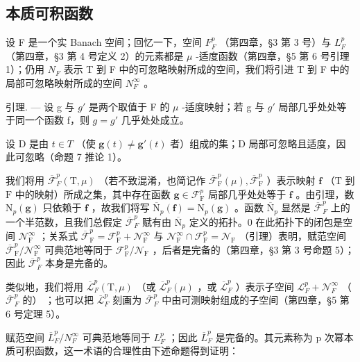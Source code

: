 \subsection{本质可积函数}

设 F 是一个实 Banach 空间；回忆一下，空间 \(F_{F}^{p}\) （第四章，§3 第 3 号）与 \(L_{F}^{p}\) （第四章，§3 第 4 号定义 2）的元素都是 \(\mu\) -适度函数（第四章，§5 第 6 号引理 1）；仍用 \(N_{F}\) 表示 T 到 F 中的可忽略映射所成的空间，我们将引进 T 到 F 中的局部可忽略映射所成的空间 \(N_{F}^{\infty}\) 。

引理. --- 设 g 与 \(g'\) 是两个取值于 F 的 \(\mu\) -适度映射；若 g 与 \(g'\) 局部几乎处处等于同一个函数 f，则 \(g = g'\) 几乎处处成立。

设 D 是由 \(t \in T\) （使 \(\mathbf{g}(t) \neq \mathbf{g}'(t)\) 者）组成的集；D 局部可忽略且适度，因此可忽略（命题 7 推论 1）。

我们将用 \(\overline{\mathcal{F}}_F^p (\mathrm{T},\mu)\) （若不致混淆，也简记作 \(\overline{\mathcal{F}}_{\mathrm{F}}^{p}(\mu),\overline{\mathcal{F}}_{\mathrm{F}}^{p}\) ）表示映射 \(\mathbf{f}\) （\(\mathrm{T}\) 到 \(\mathrm{F}\) 中的映射）所成之集，其中存在函数 \(\mathbf{g}\in \mathcal{F}_{\mathrm{F}}^{p}\) 局部几乎处处等于 \(\mathbf{f}\) 。由引理，数 \(\mathrm{N}_p(\mathbf{g})\) 只依赖于 \(\mathbf{f}\) ，故我们将写 \(\overline{\mathrm{N}}_p(\mathbf{f}) = \mathrm{N}_p(\mathbf{g})\) 。函数 \(\overline{\mathrm{N}}_p\) 显然是 \(\overline{\mathcal{F}}_F^p\) 上的一个半范数，且我们总假定 \(\overline{\mathcal{F}}_F^p\) 赋有由 \(\overline{\mathrm{N}}_p\) 定义的拓扑。0 在此拓扑下的闭包是空间 \(\mathcal{N}_{\mathrm{F}}^{\infty}\) ；关系式 \(\overline{\mathcal{F}}_{\mathrm{F}}^{p} = \mathcal{F}_{\mathrm{F}}^{p} + \mathcal{N}_{\mathrm{F}}^{\infty}\) 与 \(\mathcal{N}_{\mathrm{F}}^{\infty}\cap \mathcal{F}_{\mathrm{F}}^{p} = \mathcal{N}_{\mathrm{F}}\) （引理）表明，赋范空间 \(\overline{\mathcal{F}}_{\mathrm{F}}^{p} / \mathcal{N}_{\mathrm{F}}^{\infty}\) 可典范地等同于 \(\mathcal{F}_{\mathrm{F}}^{p} / \mathcal{N}_{\mathrm{F}}\) ，后者是完备的（第四章，§3 第 3 号命题 5）；因此 \(\overline{\mathcal{F}}_F^p\) 本身是完备的。

类似地，我们将用 \(\overline{\mathcal{L}}_F^p (\mathrm{T},\mu)\) （或 \(\overline{\mathcal{L}}_F^p (\mu)\) ，或 \(\overline{\mathcal{L}}_F^p\) ）表示子空间 \(\mathcal{L}_F^p +\mathcal{N}_F^\infty\) （\(\overline{\mathcal{F}}_F^p\) 的） ；也可以把 \(\overline{\mathcal{L}}_F^p\) 刻画为 \(\overline{\mathcal{F}}_F^p\) 中由可测映射组成的子空间（第四章，§5 第 6 号定理 5）。

赋范空间 \(\overline{L}_{F}^{p}/N_{F}^{\infty}\) 可典范地等同于 \(L_{F}^{p}\) ；因此 \(\overline{L}_{F}^{p}\) 是完备的。其元素称为 p 次幂本质可积函数，这一术语的合理性由下述命题得到证明：

